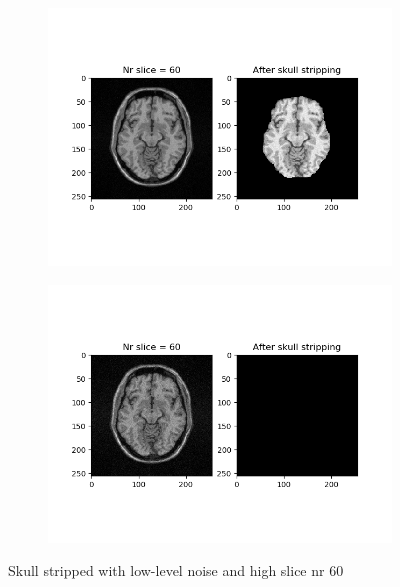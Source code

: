 \begin{figure}[H]
	\centering
	\begin{subfigure}[b]{0.35\linewidth}
		\includegraphics[scale=0.35]{figures/Module_08/M8_7.png}
	\end{subfigure}
		\begin{subfigure}[b]{0.35\linewidth}
		\includegraphics[scale=0.35]{figures/Module_08/M8_n7.png}
	\end{subfigure}
	\caption{Skull stripped with low-level noise and high slice nr 60}
	\label{fig:figures/m08_7}
\end{figure}

